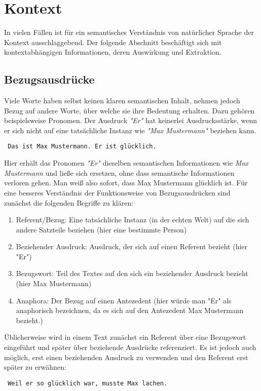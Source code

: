 \documentclass[12pt]{report}
\begin{document}
\section{Kontext}
In vielen Fällen ist für ein semantisches Verständnis von natürlicher Sprache der Kontext ausschlaggebend. Der folgende Abschnitt beschäftigt sich mit kontextabhängigen Informationen, deren Auswirkung und Extraktion. 

\subsection{Bezugsausdrücke}
Viele Worte haben selbst keinen klaren semantischen Inhalt, nehmen jedoch Bezug auf andere Worte, über welche sie ihre Bedeutung erhalten. Dazu gehören beispielsweise Pronomen. Der Ausdruck \textit{"Er"} hat keinerlei Ausdrucksstärke, wenn er sich nicht auf eine tatsächliche Instanz wie \textit{"Max Mustermann"} beziehen kann.

\tt
Das ist Max Mustermann. Er ist glücklich.
\rm

Hier erhält das Pronomen \textit{"Er"} dieselben semantischen Informationen wie \textit{Max Mustermann} und ließe sich ersetzen, ohne dass semantische Informationen verloren gehen. Man weiß also sofort, dass Max Mustermann glücklich ist. Für eine besseres Verständnis der Funktionsweise von Bezugsausdrücken sind zunächst die folgenden Begriffe zu klären:

\begin{enumerate}
\item Referent/Bezug: Eine tatsächliche Instanz (in der echten Welt) auf die sich andere Satzteile beziehen (hier eine bestimmte Person)
\item Beziehender Ausdruck: Ausdruck, der sich auf einen Referent bezieht (hier "Er")
\item Bezugswort: Teil des Textes auf den sich ein beziehender Ausdruck bezieht (hier Max Mustermann)
\item Anaphora: Der Bezug auf einen Antezedent (hier würde man "Er" als anaphorisch bezeichnen, da es sich auf den Antezedent Max Mustermann bezieht.) 
\end{enumerate}

Üblicherweise wird in einem Text zunächst ein Referent über eine Bezugswort eingeführt und später über beziehende Ausdrücke referenziert. Es ist jedoch auch möglich, erst einen beziehenden Ausdruck zu verwenden und den Referent erst später zu erwähnen:

\tt
Weil er so glücklich war, musste Max lachen.
\rm
\end{document}
